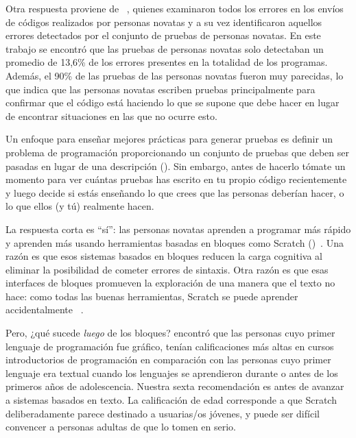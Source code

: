 Otra respuesta proviene de ~\cite{Edwa2014b},
quienes examinaron todos los errores en los envíos de códigos realizados por personas novatas
y a su vez identificaron aquellos errores detectados por el conjunto de pruebas de personas novatas.
En este trabajo se encontró que las pruebas de personas novatas solo detectaban un promedio de 13,6\% de los errores presentes en la totalidad de los programas.
Además,
el 90\% de las pruebas de las personas novatas fueron muy parecidas,
lo que indica que las personas novatas escriben pruebas principalmente para confirmar que el código está haciendo lo que se supone que debe hacer
en lugar de encontrar situaciones en las que no ocurre esto.

Un enfoque para enseñar mejores prácticas para generar pruebas es
definir un problema de programación proporcionando un conjunto de pruebas que deben ser pasadas
en lugar de una descripción ().
Sin embargo,
antes de hacerlo
tómate un momento para ver cuántas pruebas has escrito en tu propio código recientemente
y luego decide si estás enseñando lo que crees que las personas deberían hacer,
 o lo que ellos (y tú) realmente hacen.


La respuesta corta es ``sí'':
las personas novatas aprenden a programar más rápido y aprenden más
usando herramientas basadas en bloques como Scratch ()~\cite{Wein2017}.
Una razón es que esos sistemas basados en bloques reducen la carga cognitiva al eliminar la posibilidad de cometer errores de sintaxis.
Otra razón es que esas interfaces de bloques promueven la exploración de una manera que el texto no hace:
como todas las buenas herramientas,
Scratch se puede aprender accidentalmente ~\cite{Malo2010}.

Pero, ¿qué sucede \emph{luego} de los bloques?
\cite{Chen2018} encontró que las personas cuyo primer lenguaje de programación fue gráfico,
tenían calificaciones más altas en cursos introductorios de programación
en comparación con las personas cuyo primer lenguaje era textual
cuando los lenguajes se aprendieron durante o antes de los primeros años de adolescencia.
Nuestra sexta recomendación es
antes de avanzar a sistemas basados en texto.
La calificación de edad corresponde a que Scratch deliberadamente parece destinado a usuarias/os jóvenes,
y puede ser difícil convencer a personas adultas de que lo tomen en serio.

